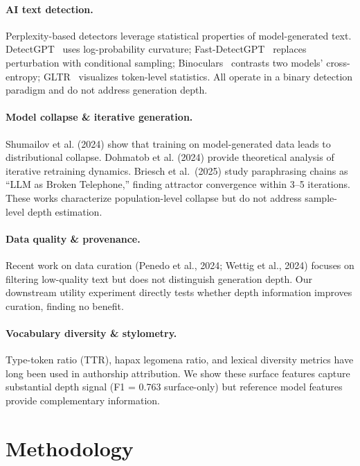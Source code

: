 \documentclass[11pt,a4paper]{article}
\begin{document}
\paragraph{AI text detection.} Perplexity-based detectors leverage statistical properties of model-generated text. DetectGPT~\citep{mitchell2023detectgpt} uses log-probability curvature; Fast-DetectGPT~\citep{bao2024fast} replaces perturbation with conditional sampling; Binoculars~\citep{hans2024binoculars} contrasts two models' cross-entropy; GLTR~\citep{gehrmann2019gltr} visualizes token-level statistics. All operate in a binary detection paradigm and do not address generation depth.

\paragraph{Model collapse \& iterative generation.} Shumailov et al. (2024) show that training on model-generated data leads to distributional collapse. Dohmatob et al. (2024) provide theoretical analysis of iterative retraining dynamics. Briesch et al.\ (2025) study paraphrasing chains as ``LLM as Broken Telephone,'' finding attractor convergence within 3--5 iterations. These works characterize population-level collapse but do not address sample-level depth estimation.

\paragraph{Data quality \& provenance.} Recent work on data curation (Penedo et al., 2024; Wettig et al., 2024) focuses on filtering low-quality text but does not distinguish generation depth. Our downstream utility experiment directly tests whether depth information improves curation, finding no benefit.

\paragraph{Vocabulary diversity \& stylometry.} Type-token ratio (TTR), hapax legomena ratio, and lexical diversity metrics have long been used in authorship attribution. We show these surface features capture substantial depth signal (F1 = 0.763 surface-only) but reference model features provide complementary information.

\section{Methodology}
\end{document}
